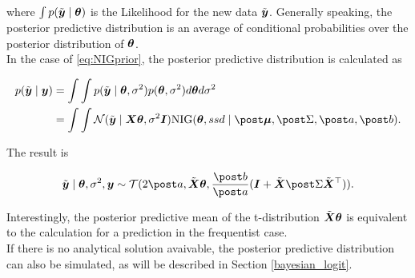 where $\int p(\tilde{\bm{y}} \mid \bm{\theta})$ is the Likelihood for the new data $\tilde{\bm{y}}$. Generally speaking, the posterior predictive distribution is an average of conditional probabilities over the posterior distribution of $\bm{\theta}$.\\

In the case of \eqref{eq:NIGprior}, the posterior predictive distribution is calculated as 

\begin{equation*}
    \begin{aligned}
        p(\ty \mid \by) &= \int \int p(\ty \mid \btheta, \ssd) p(\btheta, \ssd) d \btheta d \ssd \\
        &= \int \int \Ncal(\ty \mid \bX \btheta, \ssd \bI) \text{NIG}(\btheta, ssd \mid \mupo, \Sdpo, \apo, \bpo).
    \end{aligned}
\end{equation*}

The result is

\begin{equation*}
    \ty \mid \btheta, \ssd, \by \sim \Tcal(2 \apo, \tX \btheta, \frac{\bpo}{\apo} (\bI + \tX \Sdpo \tX^\top)).
\end{equation*}

Interestingly, the posterior predictive mean of the t-distribution $\tilde{\bm{X}} \bm{\theta}$ is equivalent to the calculation for a prediction in the frequentist case.\\

If there is no analytical solution avaivable, the posterior predictive distribution can also be simulated, as will be described in Section \ref{bayesian_logit}.
